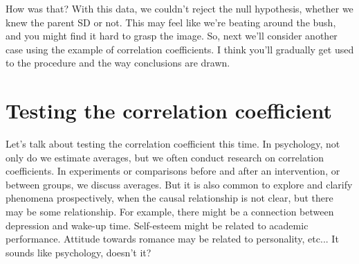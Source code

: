 \documentclass{ltjsbook}
\begin{document}


How was that? With this data, we couldn't reject the null hypothesis, whether we knew the parent SD or not. This may feel like we're beating around the bush, and you might find it hard to grasp the image. So, next we'll consider another case using the example of correlation coefficients. I think you'll gradually get used to the procedure and the way conclusions are drawn.

\section{Testing the correlation coefficient}
Let's talk about testing the correlation coefficient this time.
In psychology, not only do we estimate averages, but we often conduct research on correlation coefficients. In experiments or comparisons before and after an intervention, or between groups, we discuss averages. But it is also common to explore and clarify phenomena prospectively, when the causal relationship is not clear, but there may be some relationship. For example, there might be a connection between depression and wake-up time. Self-esteem might be related to academic performance. Attitude towards romance may be related to personality, etc... It sounds like psychology, doesn't it?
\end{document}
